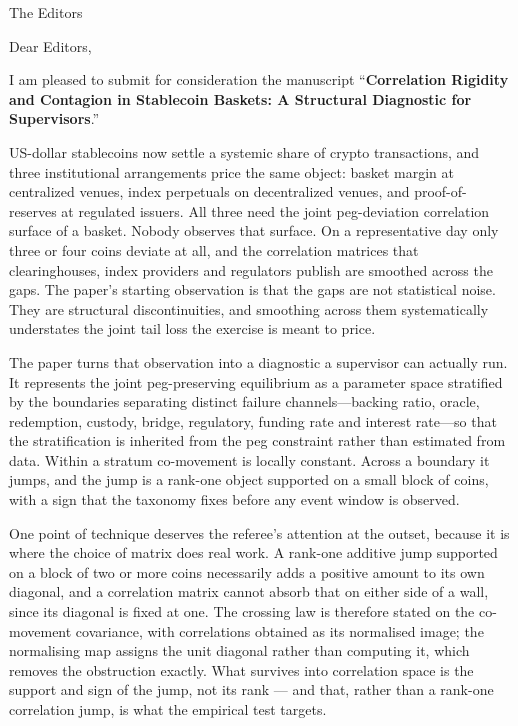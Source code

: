 \documentclass[11pt]{letter}
\begin{document}
\begin{letter}{The Editors}
\opening{Dear Editors,}

I am pleased to submit for consideration the manuscript
``\textbf{Correlation Rigidity and Contagion in Stablecoin Baskets: A Structural Diagnostic for Supervisors}.''

US-dollar stablecoins now settle a systemic share of crypto transactions, and three institutional arrangements price the same object: basket margin at centralized venues, index perpetuals on decentralized venues, and proof-of-reserves at regulated issuers. All three need the joint peg-deviation correlation surface of a basket. Nobody observes that surface. On a representative day only three or four coins deviate at all, and the correlation matrices that clearinghouses, index providers and regulators publish are smoothed across the gaps. The paper's starting observation is that the gaps are not statistical noise. They are structural discontinuities, and smoothing across them systematically understates the joint tail loss the exercise is meant to price.

The paper turns that observation into a diagnostic a supervisor can actually run. It represents the joint peg-preserving equilibrium as a parameter space stratified by the boundaries separating distinct failure channels---backing ratio, oracle, redemption, custody, bridge, regulatory, funding rate and interest rate---so that the stratification is inherited from the peg constraint rather than estimated from data. Within a stratum co-movement is locally constant. Across a boundary it jumps, and the jump is a rank-one object supported on a small block of coins, with a sign that the taxonomy fixes before any event window is observed.

One point of technique deserves the referee's attention at the outset, because it is where the choice of matrix does real work. A rank-one additive jump supported on a block of two or more coins necessarily adds a positive amount to its own diagonal, and a correlation matrix cannot absorb that on either side of a wall, since its diagonal is fixed at one. The crossing law is therefore stated on the co-movement covariance, with correlations obtained as its normalised image; the normalising map assigns the unit diagonal rather than computing it, which removes the obstruction exactly. What survives into correlation space is the support and sign of the jump, not its rank --- and that, rather than a rank-one correlation jump, is what the empirical test targets.


\end{letter}
\end{document}
